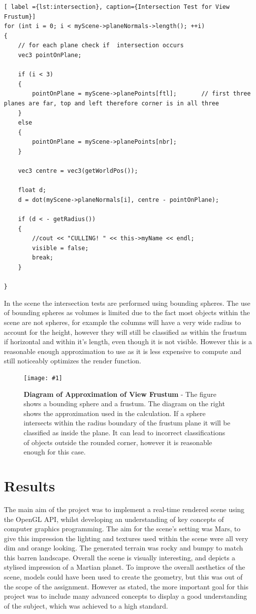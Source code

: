 \documentclass[conference]{acmsiggraph}
\newcommand{\figuremacroW}[4]{
\begin{figure}[h] %
	\centering
	\texttt{[image: \#1]}
	\caption[#2]{\textbf{#2} - #3}
	\label{fig:#1}
\end{figure}
}
\begin{document}
\begin{lstlisting}[ label ={lst:intersection}, caption={Intersection Test for View Frustum}]
for (int i = 0; i < myScene->planeNormals->length(); ++i) 
{
	// for each plane check if 	intersection occurs
	vec3 pointOnPlane;

	if (i < 3)
	{
		pointOnPlane = myScene->planePoints[ftl];		// first three planes are far, top and left therefore corner is in all three
	}
	else
	{	
		pointOnPlane = myScene->planePoints[nbr];
	}

	vec3 centre = vec3(getWorldPos());

	float d;
	d = dot(myScene->planeNormals[i], centre - pointOnPlane);

	if (d < - getRadius())
	{
		//cout << "CULLING! " << this->myName << endl;
		visible = false;
		break;
	}

}
\end{lstlisting}

In the scene the intersection tests are performed using bounding spheres. The use of bounding spheres as volumes is limited due to the fact most objects within the scene are not spheres, for example the columns will have a very wide radius to account for the height, however they will still be classified as within the frustum if horizontal and within it's length, even though it is not visible. However this is a reasonable enough approximation to use as it is less expensive to compute and still noticeably optimizes the render function.

\figuremacroW
{approxFrustum}
{Diagram of Approximation of View Frustum}
{The figure shows a bounding sphere and a frustum. The diagram on the right shows the approximation used in the calculation. If a sphere intersects within the radius boundary of the frustum plane it will be classified as inside the plane. It can lead to incorrect classifications of objects outside the rounded corner, however it is reasonable enough for this case. \cite{RTR}}
{1.0}

\section{Results}

The main aim of the project was to implement a real-time rendered scene using the OpenGL API, whilst developing an understanding of key concepts of computer graphics programming. The aim for the scene's setting was Mars, to give this impression the lighting and textures used within the scene were all very dim and orange looking. The generated terrain was rocky and bumpy to match this barren landscape. Overall the scene is visually interesting, and depicts a stylised impression of a Martian planet. To improve the overall aesthetics of the scene, models could have been used to create the geometry, but this was out of the scope of the assignment. However as stated, the more important goal for this project was to include many advanced concepts to display a good understanding of the subject, which was achieved to a high standard. 
\end{document}
